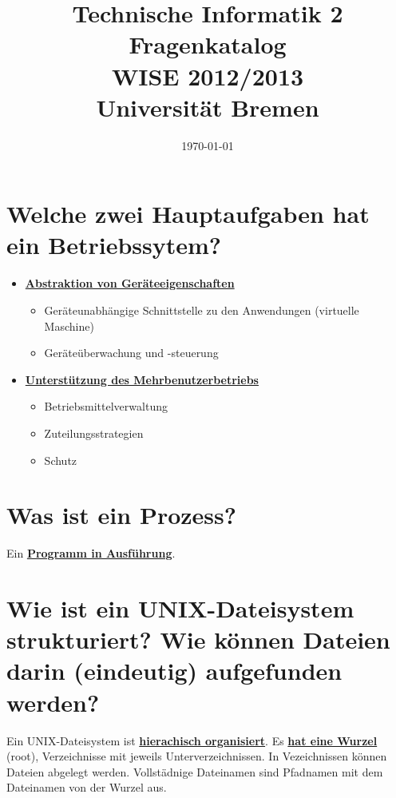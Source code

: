 \documentclass[12pt,a4paper,ngerman]{scrartcl}
\title{Technische Informatik 2 \\ Fragenkatalog \\ WISE 2012/2013 \\[5pt] \Large{Universität Bremen}}
\date{\today}
\newcommand{\crucial}[1]{\textbf{\textcolor{crucial}{\uline{#1}}}}
\newcommand{\question}[1]{#1}
\newenvironment {answer}
                {}
                {}
\begin{document}
\maketitle


\section{\question{Welche zwei Hauptaufgaben hat ein Betriebssytem?}}

\begin{answer}
    \begin{itemize}
    \item \crucial{Abstraktion von Geräteeigenschaften}
        \begin{itemize}
            \item Geräteunabhängige Schnittstelle zu den Anwendungen (virtuelle Maschine)
            \item Geräteüberwachung und -steuerung
        \end{itemize}
    
    \item \crucial{Unterstützung des Mehrbenutzerbetriebs}
        \begin{itemize}
            \item Betriebsmittelverwaltung
            \item Zuteilungsstrategien
            \item Schutz
        \end{itemize}
    \end{itemize}
\end{answer}

\section{\question{Was ist ein Prozess?}}
\begin{answer}
Ein \crucial{Programm in Ausführung}.
\end{answer}

\section{\question{Wie ist ein UNIX-Dateisystem strukturiert? Wie können Dateien darin (eindeutig) aufgefunden
werden?}}
\begin{answer}
Ein UNIX-Dateisystem ist \crucial{hierachisch organisiert}. Es \crucial{hat eine Wurzel} (root), Verzeichnisse
mit jeweils Unterverzeichnissen. In Vezeichnissen können Dateien abgelegt werden.
Vollstädnige Dateinamen sind Pfadnamen mit dem Dateinamen von der Wurzel aus.
\end{answer}
\end{document}
